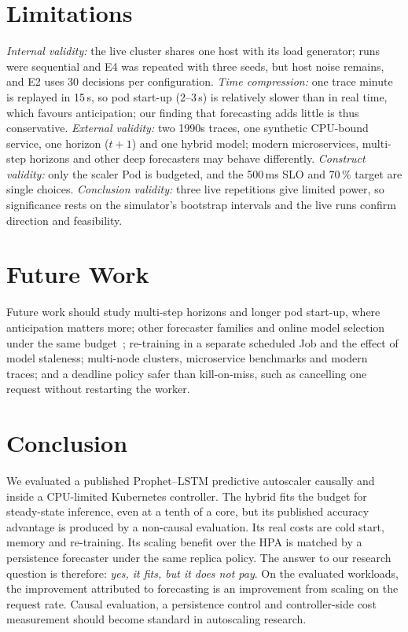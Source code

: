 \documentclass[conference,a4paper]{IEEEtran}
\begin{document}
\section{Limitations}\label{sec:limits}
\emph{Internal validity:} the live cluster shares one host with its load generator; runs were sequential and E4
was repeated with three seeds, but host noise remains, and E2 uses 30 decisions per configuration.
\emph{Time compression:} one trace minute is replayed in 15\,s, so pod start-up (2--3\,s) is relatively slower
than in real time, which favours anticipation; our finding that forecasting adds little is thus conservative.
\emph{External validity:} two 1990s traces, one synthetic CPU-bound service, one horizon ($t{+}1$) and one hybrid
model; modern microservices, multi-step horizons and other deep forecasters may behave differently.
\emph{Construct validity:} only the scaler Pod is budgeted, and the 500\,ms SLO and 70\,\% target are single
choices. \emph{Conclusion validity:} three live repetitions give limited power, so significance rests on the
simulator's bootstrap intervals and the live runs confirm direction and feasibility.

\section{Future Work}\label{sec:future}
Future work should study multi-step horizons and longer pod start-up, where anticipation matters more; other
forecaster families and online model selection under the same budget~\cite{toka2021}; re-training in a separate
scheduled Job and the effect of model staleness; multi-node clusters, microservice benchmarks and modern traces;
and a deadline policy safer than kill-on-miss, such as cancelling one request without restarting the worker.

\section{Conclusion}\label{sec:conclusion}
We evaluated a published Prophet--LSTM predictive autoscaler causally and inside a CPU-limited Kubernetes
controller. The hybrid fits the budget for steady-state inference, even at a tenth of a core, but its published
accuracy advantage is produced by a non-causal evaluation. Its real costs are cold start, memory and re-training.
Its scaling benefit over the HPA is matched by a persistence forecaster under the same replica policy. The answer
to our research question is therefore: \emph{yes, it fits, but it does not pay}. On the evaluated workloads, the
improvement attributed to forecasting is an improvement from scaling on the request rate. Causal evaluation, a
persistence control and controller-side cost measurement should become standard in autoscaling research.
\end{document}

